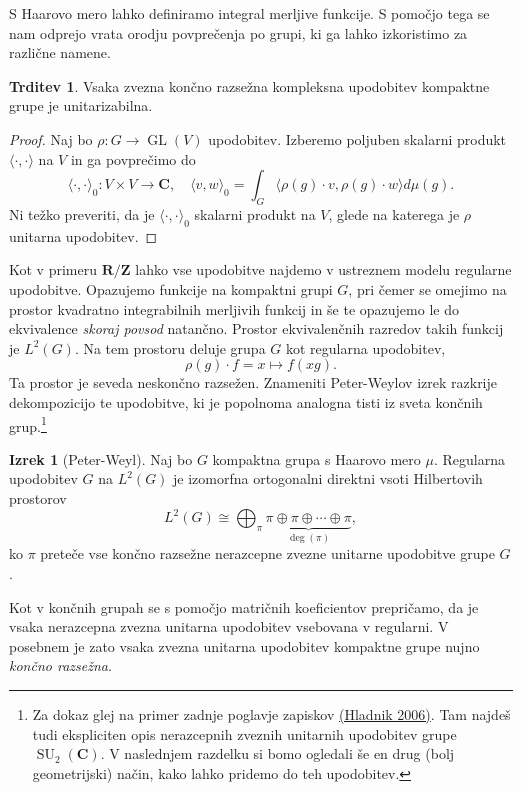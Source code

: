 \documentclass[11pt]{book}
\def\ZZ{\mathbf{Z}}
\def\RR{\mathbf{R}}
\def\CC{\mathbf{C}}
\DeclareMathOperator\SU{SU}
\DeclareMathOperator\GL{GL}
\theoremstyle{definition}
\theoremstyle{zgled}
\theoremstyle{zgledbrezstevilke}
\theoremstyle{odprtproblem}
\theoremstyle{domacanaloga}
\newenvironment{dokaz}
    {\color{siva}\begin{proof}}
    {\end{proof}}
\theoremstyle{izrek}
\newtheorem{izrek}[theorem]{Izrek}
\newtheorem{trditev}[theorem]{Trditev}
\begin{document}
S Haarovo mero lahko definiramo integral merljive funkcije. S pomočjo tega se nam odprejo vrata orodju povprečenja po grupi, ki ga lahko izkoristimo za različne namene.

\begin{trditev}
Vsaka zvezna končno razsežna kompleksna upodobitev kompaktne grupe je unitarizabilna.
\end{trditev}
\begin{dokaz}
Naj bo $\rho \colon G \to \GL(V)$ upodobitev. Izberemo poljuben skalarni produkt $\langle \cdot, \cdot \rangle$ na $V$ in ga povprečimo do
\[
    \langle \cdot, \cdot \rangle_0 \colon V \times V \to \CC, \quad
    \langle v, w \rangle_0 = \int_{G} \langle \rho(g) \cdot v, \rho(g) \cdot w \rangle d \mu (g).
\]
Ni težko preveriti, da je $\langle \cdot, \cdot \rangle_0$ skalarni produkt na $V$, glede na katerega je $\rho$ unitarna upodobitev.
\end{dokaz}

Kot v primeru $\RR/\ZZ$ lahko vse upodobitve najdemo v ustreznem modelu regularne upodobitve. Opazujemo funkcije na kompaktni grupi $G$, pri čemer se omejimo na prostor kvadratno integrabilnih merljivih funkcij in še te opazujemo le do ekvivalence \emph{skoraj povsod} natančno. Prostor ekvivalenčnih razredov takih funkcij je $L^2(G)$. Na tem prostoru deluje grupa $G$ kot regularna upodobitev,
\[
    \rho(g) \cdot f = x \mapsto f(x g).
\]
Ta prostor je seveda neskončno razsežen. Znameniti Peter-Weylov izrek razkrije dekompozicijo te upodobitve, ki je popolnoma analogna tisti iz sveta končnih grup.\footnote{Za dokaz glej na primer zadnje poglavje zapiskov \href{https://users.fmf.uni-lj.si/hladnik/3st/HA.pdf}{(Hladnik 2006)}. Tam najdeš tudi ekspliciten opis nerazcepnih zveznih unitarnih upodobitev grupe $\SU_2(\CC)$. V naslednjem razdelku si bomo ogledali še en drug (bolj geometrijski) način, kako lahko pridemo do teh upodobitev.}

\begin{izrek}[Peter-Weyl]
Naj bo $G$ kompaktna grupa s Haarovo mero $\mu$. Regularna upodobitev $G$ na $L^2(G)$ je izomorfna ortogonalni direktni vsoti Hilbertovih prostorov
\[
    L^2(G) \cong \bigoplus_{\pi} \underbrace{\pi \oplus \pi \oplus \cdots \oplus \pi}_{\deg(\pi)},
\]
ko $\pi$ preteče vse končno razsežne nerazcepne zvezne unitarne upodobitve grupe $G$.
\end{izrek}

Kot v končnih grupah se s pomočjo matričnih koeficientov prepričamo, da je vsaka nerazcepna zvezna unitarna upodobitev vsebovana v regularni. V posebnem je zato vsaka zvezna unitarna upodobitev kompaktne grupe nujno \emph{končno razsežna}.
\end{document}
